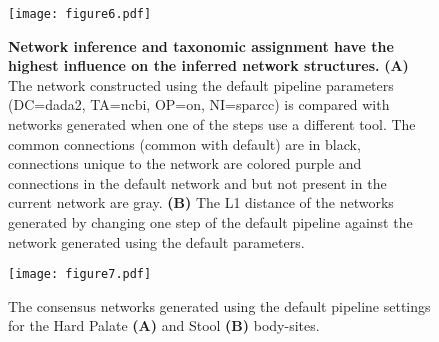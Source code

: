 \begin{figure}[h]
  \centering
  \texttt{[image: figure6.pdf]}
  \caption{
    \textbf{Network inference and taxonomic assignment have the highest influence on the inferred network structures.}
    \textbf{(A)} The network constructed using the default pipeline parameters (DC=\ac{dada2}, TA=\ac{ncbi}, OP=on, NI=\ac{sparcc}) is compared with networks generated when one of the steps use a different tool.
    The common connections (common with default) are in black, connections unique to the network are colored purple and connections in the default network and but not present in the current network are gray.
    \textbf{(B)} The L1 distance of the networks generated by changing one step of the default pipeline against the network generated using the default parameters.
  }
  \label{fig:figure6}
\end{figure}

\begin{figure}[h]
  \centering
  \texttt{[image: figure7.pdf]}
  \caption{
    The consensus networks generated using the default pipeline settings for the Hard Palate \textbf{(A)} and Stool \textbf{(B)} body-sites.
}
  \label{fig:figure7}
\end{figure}









